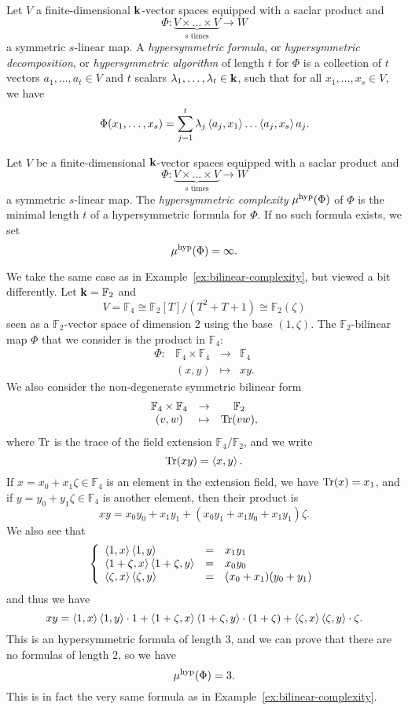 \begin{defi}
Let $V$ a finite-dimensional $\mathbf{k}$-vector
spaces equipped with a saclar product and
\[
  \Phi:\underset{\textrm{$s$ times}}{\underbrace{V\times\dots\times V}}\to W
\]
a symmetric $s$-linear map. A \emph{hypersymmetric formula}, or
\emph{hypersymmetric decomposition}, or \emph{hypersymmetric algorithm} of length $t$ for $\Phi$ is a
collection of $t$ vectors $a_1, \dots, a_t\in V$ and $t$ scalars $\lambda_1,
\dots, \lambda_t\in\mathbf{k}$, such that for all $x_1, \dots, x_s\in
V$, we have
\[
  \Phi(x_1, \dots, x_s) =
  \sum_{j=1}^t\lambda_j\left\langle a_j,x_1\right\rangle\dots\left\langle a_j,x_s\right\rangle a_j.
\]
\end{defi}
\begin{defi}
Let $V$ be a finite-dimensional $\mathbf{k}$-vector spaces equipped with a saclar product
and
\[
  \Phi:\underset{\textrm{$s$ times}}{\underbrace{V\times\dots\times V}}\to W
\]
a symmetric $s$-linear map. The \emph{hypersymmetric complexity} $\mu^{\textrm{hyp}}(\Phi)$ of $\Phi$ is the
minimal length $t$ of a hypersymmetric formula for $\Phi$. If no such
formula exists, we set
\[
  \mu^{\textrm{hyp}}(\Phi) = \infty.
\]
\end{defi}
\begin{ex}
  We take the same case as in Example~\ref{ex:bilinear-complexity}, but viewed
  a bit differently. Let $\mathbf{k}=\mathbb{F}_2$ and 
  \[
    V=\mathbb{F}_4\cong\mathbb{F}_2[T]/(T^2+T+1)\cong\mathbb{F}_2(\zeta)
  \]
  seen as a $\mathbb{F}_2$-vector space of dimension $2$ using the base $(1,
  \zeta)$. The $\mathbb{F}_2$-bilinear map $\Phi$ that we
  consider is the product in $\mathbb{F}_4$:
  \[
 \begin{array}{cccc}
   \Phi: & \mathbb{F}_4\times \mathbb{F}_4 &\to&\mathbb{F}_4\\
 &(x,y)&\mapsto&xy.
 \end{array}
  \]
  We also consider the non-degenerate symmetric bilinear form
\[
 \begin{array}{ccc}
   \mathbb{F}_4\times \mathbb{F}_4 &\to&\mathbb{F}_2\\
 (v,w)&\mapsto&\operatorname{Tr}(vw),
 \end{array}
\]
where $\operatorname{Tr}$ is the trace of the field extension $\mathbb{F}_4/\mathbb{F}_2$,
and we write
\[
  \operatorname{Tr}(xy) = \left\langle x,y\right\rangle.
\]
If $x = x_0 + x_1\zeta\in\mathbb{F}_4$ is an element in the extension field, we have $\operatorname{Tr}(x) = x_1$, and if $y = y_0
+ y_1\zeta\in\mathbb{F}_4$ is another element, then their product is
\[
  xy = x_0y_0 + x_1y_1 + (x_0y_1 + x_1y_0 + x_1y_1)\zeta.
\]
We also see that
\[
\left\{ 
  \begin{array}{lll}
    \left\langle1,x\right\rangle\left\langle1,y\right\rangle &=& x_1y_1 \\
    \left\langle1+\zeta,x\right\rangle\left\langle1+\zeta,y\right\rangle &=& x_0y_0 \\
    \left\langle\zeta,x\right\rangle\left\langle\zeta,y\right\rangle &=& (x_0+x_1)(y_0+y_1)
  \end{array}
\right.
\]
and thus we have
\[
  xy =
  \left\langle1,x\right\rangle\left\langle1,y\right\rangle\cdot1+\left\langle1+\zeta,x\right\rangle\left\langle1+\zeta,y\right\rangle\cdot(1+\zeta)+\left\langle\zeta,x\right\rangle\left\langle\zeta,y\right\rangle\cdot\zeta.
\]
This is an hypersymmetric formula of length $3$, and we can prove that there are
no formulas of length $2$, so we have
\[
  \mu^{\textrm{hyp}}(\Phi) = 3.
\]
This is in fact the very same formula as in
Example~\ref{ex:bilinear-complexity}.
\end{ex}
